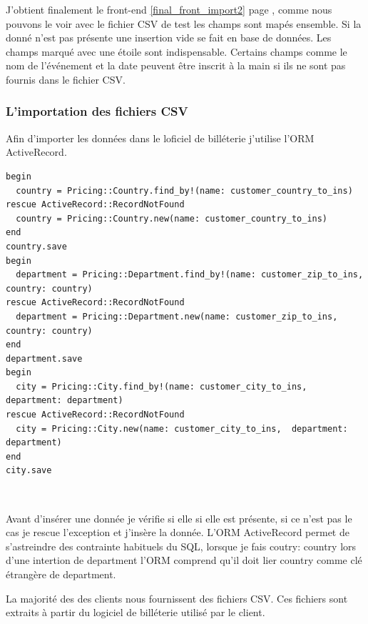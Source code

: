 J'obtient finalement le front-end \ref{final_front_import2} page \pageref{final_front_import2}, comme nous pouvons le voir avec le fichier CSV de test les champs sont mapés ensemble. Si la donné n'est pas présente une insertion vide se fait en base de données. Les champs marqué avec une étoile sont indispensable. Certains champs comme le nom de l'événement et la date peuvent être inscrit à la main si ils ne sont pas fournis dans le fichier CSV.


\subsubsection{L'importation des fichiers CSV}

Afin d'importer les données dans le loficiel de billéterie j'utilise l'ORM ActiveRecord.

\lstset{style=customruby}
\begin{lstlisting}
begin
  country = Pricing::Country.find_by!(name: customer_country_to_ins)
rescue ActiveRecord::RecordNotFound 
  country = Pricing::Country.new(name: customer_country_to_ins)
end
country.save
begin
  department = Pricing::Department.find_by!(name: customer_zip_to_ins, country: country)
rescue ActiveRecord::RecordNotFound
  department = Pricing::Department.new(name: customer_zip_to_ins,  country: country)
end
department.save
begin
  city = Pricing::City.find_by!(name: customer_city_to_ins, department: department)
rescue ActiveRecord::RecordNotFound
  city = Pricing::City.new(name: customer_city_to_ins,  department: department)
end
city.save
\end{lstlisting}
\leavevmode \

Avant d'insérer une donnée je vérifie si elle si elle est présente, si ce n'est pas le cas je rescue l'exception et j'insère la donnée. 
L'ORM ActiveRecord permet de s'astreindre des contrainte habituels du SQL, lorsque je fais coutry: country lors d'une intertion de department l'ORM comprend qu'il doit lier country comme clé étrangère de department.

La majorité des des clients nous fournissent des fichiers CSV. Ces fichiers sont extraits à partir du logiciel de billéterie utilisé par le client.



